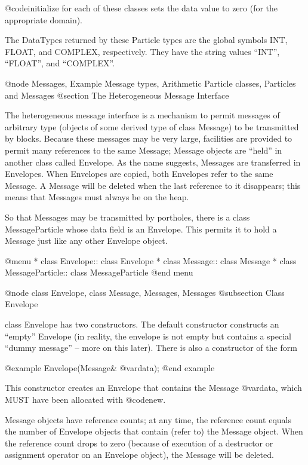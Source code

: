 @code{initialize} for each of these classes sets the data value to
zero (for the appropriate domain).

The DataTypes returned by these Particle types are the global symbols
INT, FLOAT, and COMPLEX, respectively.  They have the string values
``INT'', ``FLOAT'', and ``COMPLEX''.

@node Messages, Example Message types, Arithmetic Particle classes, Particles and Messages
@section The Heterogeneous Message Interface

The heterogeneous message interface is a mechanism to permit messages of
arbitrary type (objects of some derived type of class Message) to be
transmitted by blocks.  Because these messages may be very large,
facilities are provided to permit many references to the same Message;
Message objects are ``held'' in another class called Envelope.  As the
name suggests, Messages are transferred in Envelopes.  When Envelopes
are copied, both Envelopes refer to the same Message.  A Message will
be deleted when the last reference to it disappears; this means that
Messages must always be on the heap.

So that Messages may be transmitted by portholes, there is a class
MessageParticle whose data field is an Envelope.  This permits it to
hold a Message just like any other Envelope object.

@menu
* class Envelope::              class Envelope
* class Message::               class Message
* class MessageParticle::       class MessageParticle
@end menu

@node class Envelope, class Message, Messages, Messages
@subsection Class Envelope

class Envelope has two constructors.  The default constructor constructs
an ``empty'' Envelope (in reality, the envelope is not empty but contains
a special ``dummy message'' -- more on this later).  There is also a
constructor of the form

@example
Envelope(Message& @var{data});
@end example

This constructor creates an Envelope that contains the Message
@var{data}, which MUST have been allocated with @code{new}.

Message objects have reference counts; at any time, the reference count
equals the number of Envelope objects that contain (refer to) the
Message object.  When the reference count drops to zero (because of
execution of a destructor or assignment operator on an Envelope object),
the Message will be deleted.

